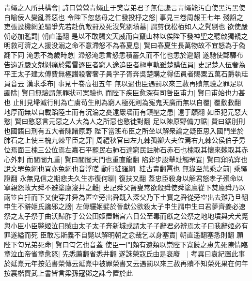 青蠅之人所共構會|{
	詩曰營營青蠅止于樊豈弟君子無信讒言青蠅能汚白使黑汚黑使白喻佞人變亂善惡也}
令陛下忽慈母之仁發投杼之怒|{
	事見三卷周赧王七年}
殘諂之吏張設機網並驅爭先若赴仇敵罸及死沒髠剔墳墓|{
	謂剪伐松栢如人之髠剔也}
欲使嚴朝必加濫罰|{
	朝直遥翻}
是以不敢觸突天威而自竄山林以俟陛下發神聖之聽啟獨覩之明救可濟之人援没溺之命不意滯怒不為春夏息|{
	賢曰春夏生長萬物故不宜怒為于偽翻下同}
淹恚不為歲時怠|{
	滯怒淹恚言怒恚積蓄久而不化也恚於避翻}
遂馳使郵驛布告遠近嚴文尅剝痛於霜雪逐臣者窮人途追臣者極車軌雖楚購伍員|{
	史記楚人伍奢為平王太子建太傅費無極譖殺奢奢子員字子胥奔吳楚購之得伍員者賜粟五萬石爵執珪員音云}
漢求季布|{
	事見十卷高祖五年}
無以過也臣遇罰以來三赦再贖無驗之罪足以蠲除|{
	賢曰無驗謂無罪狀可案驗也}
而陛下疾臣愈深有司咎臣甫力|{
	賢曰甫始也力甚也}
止則見埽滅行則為亡虜苟生則為窮人極死則為寃鬼天廣而無以自覆|{
	覆敷救翻}
地厚而無以自載蹈陸土而有沉淪之憂遠巖墻而有鎮壓之患|{
	遠于願翻}
如臣犯元惡大憝|{
	賢曰憝惡言元惡之人大為人之所惡也憝徒對翻}
足以陳原野備刀鋸|{
	賢曰鋸刖刑也國語曰刑有五大者陳諸原野}
陛下當班布臣之所坐以解衆論之疑臣思入國門坐於肺石之上使三槐九棘平臣之罪|{
	周禮秋官曰左九棘孤卿大夫位焉右九棘公侯伯子男位焉面三槐三公位焉左嘉石平罷民右肺石達窮民註肺石赤石也槐取其懷來棘取其赤心外刺}
而閶闔九重|{
	賢曰閶闔天門也重直龍翻}
陷穽步設舉趾觸罘罝|{
	賢曰穽阬穽也說文罘兔網也罝亦兔網也音浮嗟}
動行絓羅網|{
	絓古賣翻罥也}
無緣至萬乘之前|{
	乘繩證翻}
永無見信之期悲夫久生亦復何聊|{
	復扶又翻}
蓋忠臣殺身以解君怒孝子殞命以寧親怨故大舜不避塗廩浚井之難|{
	史記舜父瞽叟常欲殺舜使舜塗廩從下焚廩舜乃以兩笠自扞而下又使穿井舜為匿空旁出舜既入深父乃下土實之舜從旁空出去難乃旦翻}
申生不辭姬氏讒邪之謗|{
	左傳驪姬嬖於晉獻公欲殺太子申生謂申生曰君夢齊姜必速祭之太子祭于曲沃歸胙于公公田姬置諸宫六日公至毒而獻之公祭之地地墳與犬犬斃與小臣小臣斃姬泣曰賊由太子太子奔新城或謂太子子辭君必辨焉太子曰我辭姬必有罪遂縊而死}
臣敢忘斯義不自斃以解明朝之忿哉乞以身塞責|{
	朝直遥翻塞悉則翻}
願陛下匄兄弟死命|{
	賢曰匄乞也音蓋}
使臣一門頗有遺類以崇陛下寛饒之惠先死陳情臨章泣血帝省章愈怒|{
	先悉薦翻省悉井翻}
遂誅榮寇氏由是衰廢　|{
	考異曰袁紀置此事於延熹元年按范書榮傳云延熹中被罪榮書又云遇罰以來三赦再贖不知榮死果在何年按襄楷竇武上書皆言梁孫寇鄧之誅今置於此}



